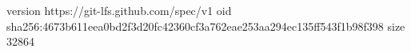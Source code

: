 version https://git-lfs.github.com/spec/v1
oid sha256:4673b611eea0bd2f3d20fc42360cf3a762eae253aa294ec135ff543f1b98f398
size 32864
